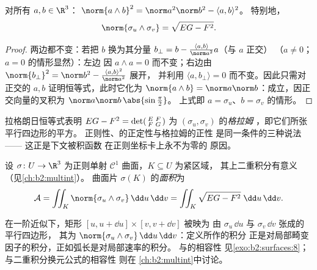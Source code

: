 \begin{lemma}[拉格朗日恒等式]\label{lem:b2:surfaces:lagrange}
对所有 $a, b \in \R^3$：
$\norm{a \wedge b}^2 = \norm a^2 \norm b^2 - \langle a, b\rangle^2$。
特别地，
\[
\norm{\sigma_u \wedge \sigma_v} = \sqrt{EG - F^2}.
\]
\end{lemma}

\begin{proof}
两边都不变：若把 $b$ 换为其分量 $b_\perp
= b - \frac{\langle a, b\rangle}{\norm a^2}a$（与 $a$ 正交）
（$a \neq 0$；$a = 0$ 的情形显然）：左边
因 $a \wedge a = 0$ 而不变；右边由 $\norm
{b_\perp}^2 = \norm b^2 - \frac{\langle a,b\rangle^2}{\norm a^2}$ 展开，
并利用 $\langle a, b_\perp\rangle = 0$ 而不变。因此只需对正交的
$a, b$ 证明恒等式，此时它化为 $\norm{a \wedge
b} = \norm a \norm b$：成立，因正交向量的叉积为
$\norm a\norm b\,\abs{\sin\frac\pi2}$。
上式即 $a = \sigma_u$、$b = \sigma_v$ 的情形。
\end{proof}

\begin{remark}
拉格朗日恒等式表明 $EG - F^2 = \det\begin{psmallmatrix}
E & F\\ F & G\end{psmallmatrix}$ 为 $(\sigma_u, \sigma_v)$ 的\emph{格拉姆
}，即它们所张平行四边形的平方。
正则性、的正定性与格拉姆的正性
是同一条件的三种说法——
这正是下文被积函数
在正则坐标卡上永不为零的
原因。
\end{remark}

\begin{definition}[面积]\label{def:b2:surfaces:area}
设 $\sigma \colon U \to \R^3$ 为正则单射
$\mathcal{C}^1$ 曲面，$K \subseteq U$ 为紧区域，
其上二重积分有意义（见\cref{ch:b2:multint}）。
曲面片 $\sigma(K)$ 的\emph{面积}为
\[
\mathcal{A}
= \iint_K \norm{\sigma_u \wedge \sigma_v}\,\dd u\,\dd v
= \iint_K \sqrt{EG - F^2}\;\dd u\,\dd v .
\]
\end{definition}

\begin{remark}[此公式的来由]
在一阶近似下，矩形 $[u, u + \dd u] \times [v, v + \dd v]$ 被映为
由 $\sigma_u\,\dd u$ 与 $\sigma_v\,\dd v$ 张成的平行四边形，
其为 $\norm{\sigma_u \wedge
\sigma_v}\,\dd u\,\dd v$：定义所作的积分
正是对局部畸变因子的积分，正如弧长是对局部速率的积分。
与的相容性
见\cref{exo:b2:surfaces:8}；与二重积分换元公式的相容性
则在
\cref{ch:b2:multint}中讨论。
\end{remark}

